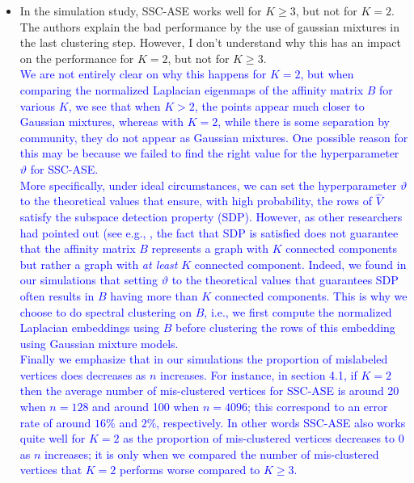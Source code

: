 \documentclass[
]{article}
\begin{document}
\begin{itemize}
{  We hope to address these topics in future research. 
  }
\item
  In the simulation study, SSC-ASE works well for \(K \geq 3\), but not
  for \(K = 2\). The authors explain the bad performance by the use of
  gaussian mixtures in the last clustering step. However, I don't
  understand why this has an impact on the performance for \(K = 2\),
  but not for \(K \geq 3\).\\
  \textcolor{blue}{
  We are not entirely clear on why this happens for $K = 2$, but when
  comparing the normalized Laplacian eigenmaps of the affinity matrix
  $B$ for various $K$, we see that when $K > 2$, the points appear much
  closer to Gaussian mixtures, whereas with $K = 2$, while there is some
  separation by community, they do not appear as Gaussian mixtures. 
  One possible reason for this may be because we failed to find the
  right value for the hyperparameter $\vartheta$ for SSC-ASE. 
  }\\
  \textcolor{blue}{
  More specifically, under ideal circumstances, we can set the hyperparameter $\vartheta$ to
  the theoretical values that ensure, with high probability, the rows of $\hat{V}$ satisfy the subspace
  detection property (SDP). However, as other researchers had pointed out (see
  e.g., \citep{sdp_sufficiency,liu_ssc}, the fact that SDP is satisfied
  does not guarantee that the affinity matrix $B$ represents a graph
  with $K$ connected components but rather a graph with {\em at least}
  $K$ connected component. Indeed, we found in our simulations that
  setting $\vartheta$ to the theoretical values that guarantees 
  SDP often results in $B$ having more than $K$ connected components.
  This is why we choose to do spectral clustering on $B$, i.e., we first
  compute the normalized Laplacian embeddings using $B$ before
  clustering the rows of this embedding using Gaussian mixture models. 
  }\\
  \textcolor{blue}{
  Finally we emphasize that in our simulations the proportion of mislabeled
  vertices does decreases as $n$ increases. For instance, in section 4.1, if $K = 2$ then the average number of mis-clustered vertices for SSC-ASE is around 20 when $n = 128$ and around 100 when
  $n = 4096$; this correspond to an error rate of around $16\%$ and
  $2\%$, respectively. In other words SSC-ASE also works quite well for $K =
  2$ as the proportion of mis-clustered vertices decreases to $0$ as $n$
  increases; it is only when we compared the number of mis-clustered
  vertices that $K = 2$ performs worse compared to $K \geq 3$. 
}
\end{itemize}
\end{document}

